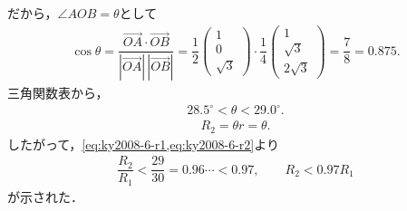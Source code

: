 \documentclass[../main.tex]{subfiles}
\begin{document}
だから，$\angle AOB=\theta$として
\begin{align}
  \cos\theta=\dfrac{\overrightarrow{OA}\cdot\overrightarrow{OB}}{|\overrightarrow{OA}|\,|\overrightarrow{OB}|}
  =\dfrac{1}{2}
  \begin{pmatrix}1\\0\\\sqrt{3}
  \end{pmatrix}\cdot
  \dfrac{1}{4}
  \begin{pmatrix}1\\\sqrt{3}\\2\sqrt{3}
  \end{pmatrix}
  =\dfrac{7}{8}=0.875.
\end{align}
三角関数表から，
\begin{align}28.5^\circ<\theta<29.0^\circ.\label{eq:ky2008-6-angle}
\end{align}
\begin{align}R_2=\theta r=\theta.\label{eq:ky2008-6-r2}
\end{align}
したがって，\cref{eq:ky2008-6-r1,eq:ky2008-6-r2}より
\begin{align}\dfrac{R_2}{R_1}<\dfrac{29}{30}=0.96\cdots<0.97,\qquad R_2<0.97R_1
\end{align}
が示された．
\newpage
\end{document}
